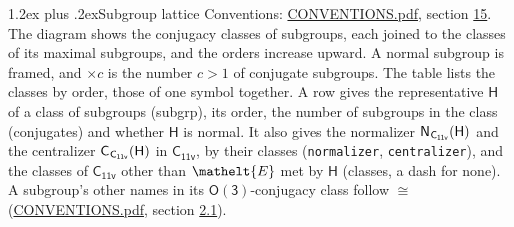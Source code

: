 \documentclass[10pt,a4paper]{article}
\makeatletter
\renewcommand\section{\@startsection{section}{1}{\z@}{-3ex plus -1ex minus -.2ex}%
  {1.2ex plus .2ex}{\normalfont\large\sffamily\bfseries\color{parttitle}}}
\numberwithin{equation}{section}
\newcommand{\eltfont}[1]{{\let\sigma\eltsigma\mathelt{#1}}}
\newcommand{\grp}[1]{\mathsf{#1}}
\newcommand{\cls}[1]{\eltfont{#1}}
\newcommand{\samecls}{\cong}
\newcommand{\nconj}[1]{{\scriptsize$\times#1$}}
\newcommand{\hairsp}{\mkern1mu}
\makeatother
\begin{document}
\section{Subgroup lattice}\label{s:subgroups}
Conventions: \href{../../CONVENTIONS.pdf}{CONVENTIONS.pdf}, section \href{../../CONVENTIONS.pdf\#conv.15}{15}.
The diagram shows the conjugacy classes of subgroups, each joined to the classes of its maximal subgroups, and the orders increase upward. A normal subgroup is framed, and ${\times}c$ is the number $c > 1$ of conjugate subgroups. The table lists the classes by order, those of one symbol together. \label{n:group.H}\label{n:head.subgroup}\label{n:head.order}\label{n:head.conjugates}\label{n:head.normal}A row gives the representative $\grp{H}$ of a class of subgroups (subgrp), its order, the number of subgroups in the class (conjugates) and whether $\grp{H}$ is normal. \label{n:group.normalizer}\label{n:group.centralizer}\label{n:head.classes}It also gives the normalizer $\grp{N}_{\hairsp \grp{C_{11v}}}(\grp{H})$ and the centralizer $\grp{C}_{\hairsp \grp{C_{11v}}}(\grp{H})$ in $\grp{C_{11v}}$, by their classes (\texttt{normalizer}, \texttt{centralizer}), and the classes of $\grp{C_{11v}}$ other than $\cls{E}$ met by $\grp{H}$ (classes, a dash for none). A subgroup's other names in its \href{O3.pdf}{$\grp{O(3)}$}-conjugacy class follow $\samecls$ (\href{../../CONVENTIONS.pdf}{CONVENTIONS.pdf}, section \href{../../CONVENTIONS.pdf\#conv.2.1}{2.1}).
\begin{center}
\end{center}
\end{document}
